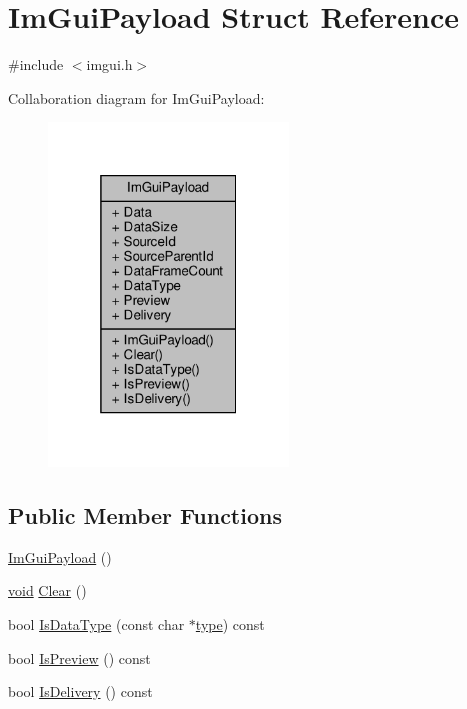 \hypertarget{structImGuiPayload}{}\section{Im\+Gui\+Payload Struct Reference}
\label{structImGuiPayload}


{\ttfamily \#include $<$imgui.\+h$>$}



Collaboration diagram for Im\+Gui\+Payload\+:
\nopagebreak
\begin{figure}[H]
\begin{center}
\leavevmode
\includegraphics[width=181pt]{structImGuiPayload__coll__graph}
\end{center}
\end{figure}
\subsection*{Public Member Functions}
\begin{DoxyCompactItemize}
\item 
\hyperlink{structImGuiPayload_a341c0039af838af0308a7449f8c1308b}{Im\+Gui\+Payload} ()
\item 
\hyperlink{imgui__impl__opengl3__loader_8h_ac668e7cffd9e2e9cfee428b9b2f34fa7}{void} \hyperlink{structImGuiPayload_a88c2293d356eb05e7a30d7693de186f2}{Clear} ()
\item 
bool \hyperlink{structImGuiPayload_a7864aeb80bc28683748d015562eead4d}{Is\+Data\+Type} (const char $\ast$\hyperlink{imgui__impl__opengl3__loader_8h_a63267399cd2a2ee217572c11d2e54f07}{type}) const
\item 
bool \hyperlink{structImGuiPayload_a4a7e17de25fd86c5ada447aaec412070}{Is\+Preview} () const
\item 
bool \hyperlink{structImGuiPayload_adcc193e0d454bf394e76e5498eea808d}{Is\+Delivery} () const
\end{DoxyCompactItemize}
